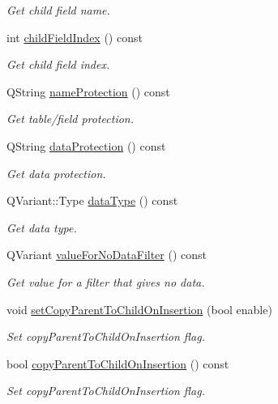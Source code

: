 \begin{DoxyCompactItemize}
\begin{DoxyCompactList}\small\item\em Get child field name. \end{DoxyCompactList}\item 
\hypertarget{classmdt_sql_relation_item_a89f5e403c31df53c56ddfc4448d8b91d}{
int \hyperlink{classmdt_sql_relation_item_a89f5e403c31df53c56ddfc4448d8b91d}{childFieldIndex} () const }
\label{classmdt_sql_relation_item_a89f5e403c31df53c56ddfc4448d8b91d}

\begin{DoxyCompactList}\small\item\em Get child field index. \end{DoxyCompactList}\item 
QString \hyperlink{classmdt_sql_relation_item_a2aa445cebd77d6ce707b318f25cc709c}{nameProtection} () const 
\begin{DoxyCompactList}\small\item\em Get table/field protection. \end{DoxyCompactList}\item 
QString \hyperlink{classmdt_sql_relation_item_a46f16fdee2f8fba86ed82e7f7194751b}{dataProtection} () const 
\begin{DoxyCompactList}\small\item\em Get data protection. \end{DoxyCompactList}\item 
\hypertarget{classmdt_sql_relation_item_a8df1470c61b71ade740266b528f7b9a3}{
QVariant::Type \hyperlink{classmdt_sql_relation_item_a8df1470c61b71ade740266b528f7b9a3}{dataType} () const }
\label{classmdt_sql_relation_item_a8df1470c61b71ade740266b528f7b9a3}

\begin{DoxyCompactList}\small\item\em Get data type. \end{DoxyCompactList}\item 
QVariant \hyperlink{classmdt_sql_relation_item_a3d2e24b35c88b246dac2a825019f037b}{valueForNoDataFilter} () const 
\begin{DoxyCompactList}\small\item\em Get value for a filter that gives no data. \end{DoxyCompactList}\item 
void \hyperlink{classmdt_sql_relation_item_aa9826f0e86d7ba7acf046012bbf8a38f}{setCopyParentToChildOnInsertion} (bool enable)
\begin{DoxyCompactList}\small\item\em Set copyParentToChildOnInsertion flag. \end{DoxyCompactList}\item 
bool \hyperlink{classmdt_sql_relation_item_a959affdf96c2d4882028270f9ae7cf00}{copyParentToChildOnInsertion} () const 
\begin{DoxyCompactList}\small\item\em Set copyParentToChildOnInsertion flag. \end{DoxyCompactList}\end{DoxyCompactItemize}


